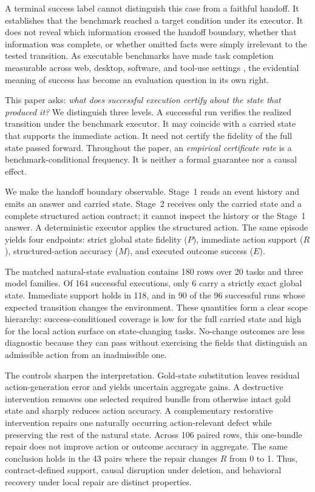 \documentclass[11pt]{article}
\newcommand{\Rsupport}{R}
\newcommand{\Pstrict}{P}
\newcommand{\Maction}{M}
\newcommand{\Eoutcome}{E}
\begin{document}
A terminal success label cannot distinguish this case from a faithful handoff. It establishes that the benchmark reached a target condition under its executor. It does not reveal which information crossed the handoff boundary, whether that information was complete, or whether omitted facts were simply irrelevant to the tested transition. As executable benchmarks have made task completion measurable across web, desktop, software, and tool-use settings \citep{liu2024agentbench,zhou2024webarena,drouin2024workarena,xie2024osworld,jimenez2024swebench,trivedi2024appworld,yao2025taubench}, the evidential meaning of success has become an evaluation question in its own right.

This paper asks: \emph{what does successful execution certify about the state that produced it?} We distinguish three levels. A successful run verifies the realized transition under the benchmark executor. It may coincide with a carried state that supports the immediate action. It need not certify the fidelity of the full state passed forward. Throughout the paper, an \emph{empirical certificate rate} is a benchmark-conditional frequency. It is neither a formal guarantee nor a causal effect.

We make the handoff boundary observable. Stage~1 reads an event history and emits an answer and carried state. Stage~2 receives only the carried state and a complete structured action contract; it cannot inspect the history or the Stage~1 answer. A deterministic executor applies the structured action. The same episode yields four endpoints: strict global state fidelity (\(\Pstrict\)), immediate action support (\(\Rsupport\)), structured-action accuracy (\(\Maction\)), and executed outcome success (\(\Eoutcome\)).

The matched natural-state evaluation contains 180 rows over 20 tasks and three model families. Of 164 successful executions, only 6 carry a strictly exact global state. Immediate support holds in 118, and in 90 of the 96 successful runs whose expected transition changes the environment. These quantities form a clear scope hierarchy: success-conditioned coverage is low for the full carried state and high for the local action surface on state-changing tasks. No-change outcomes are less diagnostic because they can pass without exercising the fields that distinguish an admissible action from an inadmissible one.

The controls sharpen the interpretation. Gold-state substitution leaves residual action-generation error and yields uncertain aggregate gains. A destructive intervention removes one selected required bundle from otherwise intact gold state and sharply reduces action accuracy. A complementary restorative intervention repairs one naturally occurring action-relevant defect while preserving the rest of the natural state. Across 106 paired rows, this one-bundle repair does not improve action or outcome accuracy in aggregate. The same conclusion holds in the 43 pairs where the repair changes \(\Rsupport\) from 0 to 1. Thus, contract-defined support, causal disruption under deletion, and behavioral recovery under local repair are distinct properties.
\end{document}
